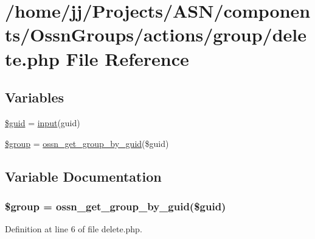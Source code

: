 \hypertarget{components_2_ossn_groups_2actions_2group_2delete_8php}{}\section{/home/jj/\+Projects/\+A\+S\+N/components/\+Ossn\+Groups/actions/group/delete.php File Reference}
\label{components_2_ossn_groups_2actions_2group_2delete_8php}
\subsection*{Variables}
\begin{DoxyCompactItemize}
\item 
\hyperlink{components_2_ossn_groups_2actions_2group_2delete_8php_af99126304cbcb2e1483892c40bb3aae4}{\$guid} = \hyperlink{ossn_8lib_8input_8php_a64ebee98b041c4f75f71ed3cd73cc8ed}{input}(\textquotesingle{}guid\textquotesingle{})
\item 
\hyperlink{components_2_ossn_groups_2actions_2group_2delete_8php_ad530a85733b0ec1dc321859fd8faa0dc}{\$group} = \hyperlink{libraries_2groups_8php_a134232596460947e7923a5ec7b255375}{ossn\+\_\+get\+\_\+group\+\_\+by\+\_\+guid}(\$guid)
\end{DoxyCompactItemize}


\subsection{Variable Documentation}
\subsubsection[{\texorpdfstring{\$group}{$group}}]{\setlength{\rightskip}{0pt plus 5cm}\$group = {\bf ossn\+\_\+get\+\_\+group\+\_\+by\+\_\+guid}(\$guid)}\hypertarget{components_2_ossn_groups_2actions_2group_2delete_8php_ad530a85733b0ec1dc321859fd8faa0dc}{}\label{components_2_ossn_groups_2actions_2group_2delete_8php_ad530a85733b0ec1dc321859fd8faa0dc}


Definition at line 6 of file delete.\+php.

